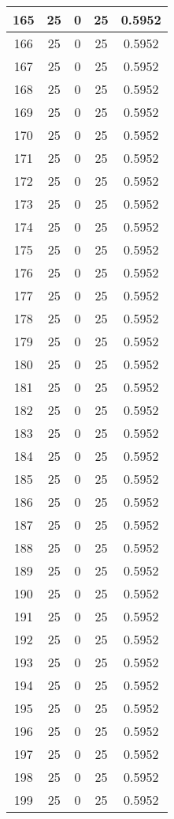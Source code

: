 \documentclass[letterpaper, 12pt]{article}
\begin{document}
\begin{longtable}{|c|c|c|c|c|}
\hline
165 & 25 & 0 & 25 & 0.5952 \\
\hline
166 & 25 & 0 & 25 & 0.5952 \\
\hline
167 & 25 & 0 & 25 & 0.5952 \\
\hline
168 & 25 & 0 & 25 & 0.5952 \\
\hline
169 & 25 & 0 & 25 & 0.5952 \\
\hline
170 & 25 & 0 & 25 & 0.5952 \\
\hline
171 & 25 & 0 & 25 & 0.5952 \\
\hline
172 & 25 & 0 & 25 & 0.5952 \\
\hline
173 & 25 & 0 & 25 & 0.5952 \\
\hline
174 & 25 & 0 & 25 & 0.5952 \\
\hline
175 & 25 & 0 & 25 & 0.5952 \\
\hline
176 & 25 & 0 & 25 & 0.5952 \\
\hline
177 & 25 & 0 & 25 & 0.5952 \\
\hline
178 & 25 & 0 & 25 & 0.5952 \\
\hline
179 & 25 & 0 & 25 & 0.5952 \\
\hline
180 & 25 & 0 & 25 & 0.5952 \\
\hline
181 & 25 & 0 & 25 & 0.5952 \\
\hline
182 & 25 & 0 & 25 & 0.5952 \\
\hline
183 & 25 & 0 & 25 & 0.5952 \\
\hline
184 & 25 & 0 & 25 & 0.5952 \\
\hline
185 & 25 & 0 & 25 & 0.5952 \\
\hline
186 & 25 & 0 & 25 & 0.5952 \\
\hline
187 & 25 & 0 & 25 & 0.5952 \\
\hline
188 & 25 & 0 & 25 & 0.5952 \\
\hline
189 & 25 & 0 & 25 & 0.5952 \\
\hline
190 & 25 & 0 & 25 & 0.5952 \\
\hline
191 & 25 & 0 & 25 & 0.5952 \\
\hline
192 & 25 & 0 & 25 & 0.5952 \\
\hline
193 & 25 & 0 & 25 & 0.5952 \\
\hline
194 & 25 & 0 & 25 & 0.5952 \\
\hline
195 & 25 & 0 & 25 & 0.5952 \\
\hline
196 & 25 & 0 & 25 & 0.5952 \\
\hline
197 & 25 & 0 & 25 & 0.5952 \\
\hline
198 & 25 & 0 & 25 & 0.5952 \\
\hline
199 & 25 & 0 & 25 & 0.5952 \\
\hline
\end{longtable}
\end{document}
